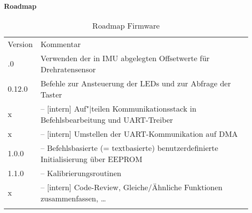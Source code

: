 \paragraph{Roadmap}


\begin{table}[htbp]%
	\centering
	\caption{Roadmap Firmware}
	\label{tab:repo:fw_roadmap}
	\begin{tabular}{lp{10cm}}
		\mytoprule
		Version & Kommentar \\
		\mymidrule
		0.12.0
			& Verwenden der in IMU abgelegten Offsetwerte für Drehratensensor \\
		0.12.0
			& Befehle zur Ansteuerung der LEDs und zur Abfrage der Taster \\
		x
			& -- [intern] Auf"|teilen Kommunikationsstack in Befehlsbearbeitung und UART-Treiber \\
		x
			& -- [intern] Umstellen der UART-Kommunikation auf DMA \\
		1.0.0
			& -- Befehlsbasierte (= textbasierte) benutzerdefinierte Initialisierung über EEPROM \\
		1.1.0
			& -- Kalibrierungsroutinen \\
		x
			& -- [intern] Code-Review, Gleiche/Ähnliche Funktionen zusammenfassen, \ldots \\
		\mybottomrule
	\end{tabular}
\end{table}
